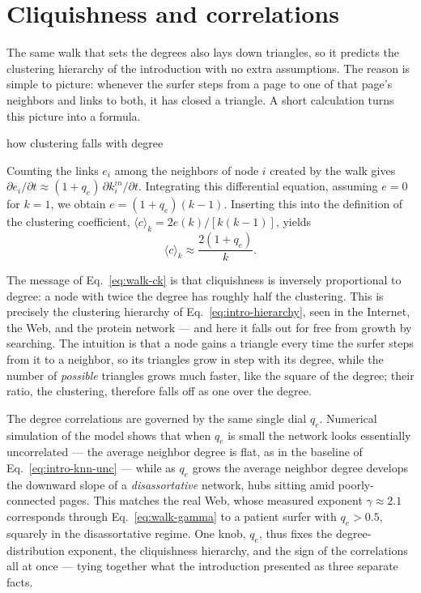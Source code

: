 \section{Cliquishness and correlations}

The same walk that sets the degrees also lays down triangles, so it predicts the
clustering hierarchy of the introduction with no extra assumptions. The reason
is simple to picture: whenever the surfer steps from a page to one of that
page's neighbors and links to both, it has closed a triangle. A short
calculation turns this picture into a formula.

\begin{calculation}{how clustering falls with degree}

Counting the links $e_i$ among the neighbors of node $i$ created by the walk 
gives $\partial e_i/\partial t \approx (1+q_e)\,\partial k^{in}_i/\partial 
t$. Integrating this differential equation, assuming $e = 0$ for $k = 1$, we 
obtain $e = (1 + q_e) (k - 1)$. Inserting this into the definition of the 
clustering coefficient,
$\langle c\rangle_k = 2e(k)/[k(k-1)]$, yields
\begin{equation}
  \langle c \rangle_k \approx \frac{2(1+q_e)}{k}.
  \label{eq:walk-ck}
\end{equation}
\end{calculation}

The message of Eq.~\eqref{eq:walk-ck} is that cliquishness is inversely
proportional to degree: a node with twice the degree has roughly half the
clustering. This is precisely the clustering hierarchy of
Eq.~\eqref{eq:intro-hierarchy}, seen in the Internet, the Web, and the protein
network --- and here it falls out for free from growth by searching. The
intuition is that a node gains a triangle every time the surfer steps from it to
a neighbor, so its triangles grow in step with its degree, while the number of
\emph{possible} triangles grows much faster, like the square of the degree;
their ratio, the clustering, therefore falls off as one over the degree.

The degree correlations are governed by the same single dial $q_e$. Numerical
simulation of the model shows that when $q_e$ is small the network looks
essentially uncorrelated --- the average neighbor degree is flat, as in the
baseline of Eq.~\eqref{eq:intro-knn-unc} --- while as $q_e$ grows the average
neighbor degree develops the downward slope of a \emph{disassortative} network,
hubs sitting amid poorly-connected pages. This matches the real Web, whose
measured exponent $\gamma\approx 2.1$ corresponds through
Eq.~\eqref{eq:walk-gamma} to a patient surfer with $q_e>0.5$, squarely in the
disassortative regime. One knob, $q_e$, thus fixes the degree-distribution
exponent, the cliquishness hierarchy, and the sign of the correlations all at
once --- tying together what the introduction presented as three separate facts.

